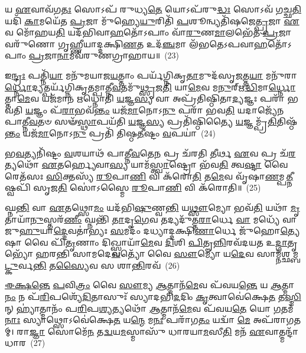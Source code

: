 𑌯 \ul{𑌏}\-𑌵𑌾𑌵᳴𑌗\-\ul{𑌤𑌃} 𑌸𑍋\-𑌽𑌪᳴ 𑌰𑍁𑌧𑍍𑌯\-\ul{𑌤𑍇} 𑌯𑍋\-𑌽𑌪᳴𑌰𑍁\-\ul{𑌦𑍍𑌧𑌃} 𑌸𑍋\-𑌽𑌵᳴ 𑌗𑌚𑍍𑌛\-\ul{𑌤𑌿} 𑌯𑌦𑌿᳴ \ul{𑌕𑌾}\-𑌮𑌯𑍇᳴𑌤 \ul{𑌪𑍍𑌰}\-𑌜𑌾 𑌮𑍁᳴𑌹𑍍𑌯𑍇\-\ul{𑌯𑍁}\-𑌰𑌿𑌤𑌿᳴ \ul{𑌪}\-𑌶𑍂𑌨𑍍𑌵𑍍𑌯𑌤𑌿᳴𑌷𑌜𑍇\-\ul{𑌤𑍍𑌪𑍍𑌰}\-𑌜𑌾 \ul{𑌏}\-𑌵 𑌮𑍋᳴𑌹𑌯\-\ul{𑌤𑌿} 𑌯𑌦᳴𑌭𑌿𑌵𑌾\-\ul{𑌹}\-𑌤𑍋᳴\-𑌽𑌪𑌾𑌂 𑌵𑌾᳴\-\ul{𑌰𑍁}\-𑌣\-\ul{𑌮𑌾}\-𑌲𑌭𑍇᳴𑌤 \ul{𑌪𑍍𑌰}\-𑌜𑌾 𑌵𑌰𑍁᳴𑌣𑍋 𑌗𑍃𑌹𑍍𑌣𑍀𑌯𑌾𑌦𑍍𑌦𑌕𑍍𑌷𑌿\-\ul{𑌣}\-𑌤 𑌉𑌦᳴\-\ul{𑌞𑍍𑌚}\-𑌮𑌾 𑌲᳴𑌭𑌤𑍇\-𑌽𑌪𑌵𑌾\-\ul{𑌹}\-𑌤𑍋᳴\-𑌽\-𑌪𑌾𑌂 \ul{𑌪𑍍𑌰}\-𑌜𑌾\-\ul{𑌨𑌾}\-𑌮𑌵᳴𑌰𑍁𑌣𑌗𑍍𑌰𑌾𑌹𑌾𑌯॥~(23)

{\anuvakamend[{𑌰𑍇\-\ul{𑌤𑍋} 𑌯𑌜᳴𑌮𑌾𑌨𑍇 𑌦𑌧𑌾𑌤𑌿 \ul{𑌲𑍋}\-𑌕 \ul{𑌐}\-𑌨𑍍𑌦𑍍𑌰𑍞 \ul{𑌸}\-𑌪𑍍𑌤𑌤𑍍𑌰𑌿𑍞᳴𑌶𑌚𑍍𑌚}]}%

𑌇\-\ul{𑌨𑍍𑌦𑍍𑌰𑌃} 𑌪𑌤𑍍𑌨𑌿᳴\-\ul{𑌯𑌾} 𑌮𑌨𑍁᳴𑌮𑌯𑌾𑌜\-\ul{𑌯}\-𑌤𑍍𑌤𑌾𑌂 𑌪𑌰𑍍𑌯᳴𑌗𑍍𑌨𑌿𑌕𑍃\-\ul{𑌤𑌾}\-𑌮𑍁𑌦᳴𑌸𑍃\-\ul{𑌜}\-𑌤𑍍𑌤\-\ul{𑌯𑌾} 𑌮𑌨𑍁᳴𑌰𑌾\-\ul{𑌰𑍍𑌧𑍍𑌨𑍋}\-𑌦𑍍𑌯𑌤𑍍𑌪𑌰𑍍𑌯᳴𑌗𑍍𑌨𑌿𑌕𑍃𑌤𑌮𑍍𑌪𑌾𑌤𑍍𑌨𑍀\-\ul{𑌵}\-𑌤𑌮𑍁᳴\-\ul{𑌥𑍍𑌸𑍃}\-𑌜\-\ul{𑌤𑌿} 𑌯𑌾\-\ul{𑌮𑍇}\-𑌵 𑌮\-\ul{𑌨𑍁}\-𑌰𑍍\mbox{}𑌋\-\ul{𑌦𑍍𑌧𑌿}\-\-𑌮𑌾\-\ul{𑌰𑍍𑌧𑍍𑌨𑍋}\-𑌤𑍍𑌤𑌾\-\ul{𑌮𑍇}\-𑌵 𑌯𑌜᳴𑌮𑌾𑌨 𑌋𑌧𑍍𑌨𑍋𑌤𑌿 \ul{𑌯}\-𑌜𑍍𑌞\-\ul{𑌸𑍍𑌯} 𑌵𑌾 𑌅𑌪𑍍𑌰᳴𑌤𑌿𑌷𑍍𑌠𑌿𑌤𑌾\-\ul{𑌦𑍍𑌯}\-𑌜𑍍𑌞𑌃 𑌪𑌰𑌾᳴ 𑌭𑌵𑌤𑌿 \ul{𑌯}\-𑌜𑍍𑌞𑌂 𑌪᳴\-\ul{𑌰𑌾}\-𑌭𑌵᳴\-\ul{𑌨𑍍𑌤𑌂} 𑌯𑌜᳴\-\ul{𑌮𑌾}\-𑌨𑍋\-𑌽\-\ul{𑌨𑍁} 𑌪𑌰𑌾᳴ 𑌭𑌵\-\ul{𑌤𑌿} 𑌯𑌦𑌾𑌜𑍍𑌯𑍇᳴𑌨 𑌪𑌾𑌤𑍍𑌨𑍀\-\ul{𑌵}\-𑌤𑍞 𑌸𑍟᳴\-\ul{𑌸𑍍𑌥𑌾}\-𑌪𑌯᳴𑌤𑌿 \ul{𑌯}\-𑌜𑍍𑌞\-\ul{𑌸𑍍𑌯} 𑌪𑍍𑌰𑌤𑌿᳴𑌷𑍍𑌠𑌿𑌤𑍍𑌯𑍈 \ul{𑌯}\-𑌜𑍍𑌞𑌮𑍍𑌪𑍍𑌰᳴\-\ul{𑌤𑌿}\-𑌤𑌿𑌷𑍍𑌠᳴\-\ul{𑌨𑍍𑌤𑌂} 𑌯𑌜᳴\-\ul{𑌮𑌾}\-𑌨𑍋\-𑌽\-\ul{𑌨𑍁} 𑌪𑍍𑌰𑌤𑌿᳴ 𑌤𑌿𑌷𑍍𑌠\-\ul{𑌤𑍀}\-𑌷𑍍𑌟𑌂 \ul{𑌵}\-𑌪𑌯𑌾॑~(24)

𑌭\-\ul{𑌵}\-𑌤𑍍𑌯𑌨𑌿᳴𑌷𑍍𑌟𑌂 \ul{𑌵}\-𑌶𑌯𑌾𑌥᳴ 𑌪𑌾𑌤𑍍𑌨𑍀\-\ul{𑌵}\-𑌤𑍇\-\ul{𑌨} 𑌪𑍍𑌰 𑌚᳴𑌰𑌤𑌿 \ul{𑌤𑍀}\-𑌰𑍍𑌥 \ul{𑌏}\-𑌵 𑌪𑍍𑌰 𑌚᳴\-\ul{𑌰}\-𑌤𑍍𑌯𑌥𑍋᳴ \ul{𑌏}\-𑌤𑌰𑍍\mbox{}\-\ul{𑌹𑍍𑌯𑍇}\-𑌵𑌾\-\ul{𑌸𑍍𑌯} 𑌯𑌾𑌮᳴\-\ul{𑌸𑍍𑌤𑍍𑌵𑌾}\-𑌷𑍍𑌟𑍍𑌰𑍋 𑌭᳴𑌵\-\ul{𑌤𑌿} 𑌤𑍍𑌵\-\ul{𑌷𑍍𑌟𑌾} 𑌵𑍈 𑌰𑍇𑌤᳴𑌸𑌃 \ul{𑌸𑌿}\-𑌕𑍍𑌤𑌸𑍍𑌯᳴ \ul{𑌰𑍂}\-𑌪𑌾\-\ul{𑌣𑌿} 𑌵𑌿 𑌕᳴𑌰𑍋\-\ul{𑌤𑌿} 𑌤\-\ul{𑌮𑍇}\-𑌵 𑌵𑍃᳴𑌷𑌾\-\ul{𑌣}\-𑌮𑍍𑌪\-\ul{𑌤𑍍𑌨𑍀}\-𑌷𑍍𑌵𑌪𑌿᳴ 𑌸𑍃𑌜\-\ul{𑌤𑌿} 𑌸𑍋॑\-𑌽𑌸𑍍𑌮𑍈 \ul{𑌰𑍂}\-𑌪𑌾\-\ul{𑌣𑌿} 𑌵𑌿 𑌕᳴𑌰𑍋𑌤𑌿॥~(25)

{\anuvakamend[{\-\ul{𑌵}\-𑌪\-\ul{𑌯𑌾} 𑌷𑌟𑍍𑌤𑍍𑌰𑌿𑍞᳴𑌶𑌚𑍍𑌚}]}%

𑌘𑍍𑌨\-\ul{𑌨𑍍𑌤𑌿} 𑌵𑌾 \ul{𑌏}\-𑌤𑌥𑍍𑌸𑍋\-\ul{𑌮𑌂} 𑌯𑌦᳴𑌭𑌿\-\ul{𑌷𑍁}\-𑌣𑍍𑌵\-\ul{𑌨𑍍𑌤𑌿} 𑌯\-\ul{𑌥𑍍𑌸𑍗}\-𑌮𑍍𑌯𑍋 𑌭𑌵᳴\-\ul{𑌤𑌿} 𑌯𑌥𑌾᳴ \ul{𑌮𑍃}\-𑌤𑌾𑌯𑌾᳴\-\ul{𑌨𑍁}\-𑌸𑍍𑌤𑌰᳴\-\ul{𑌣𑍀𑌂} 𑌘𑍍𑌨𑌨𑍍𑌤𑌿᳴ \ul{𑌤𑌾}\-𑌦𑍃\-\ul{𑌗𑍇}\-𑌵 𑌤𑌦𑍍𑌯𑌦𑍁᳴𑌤𑍍𑌤\-\ul{𑌰𑌾}\-𑌰𑍍𑌧𑍇 \ul{𑌵𑌾} 𑌮𑌧𑍍𑌯𑍇᳴ 𑌵𑌾 𑌜𑍁\-\ul{𑌹𑍁}\-𑌯𑌾\-\ul{𑌦𑍍𑌦𑍇}\-𑌵𑌤𑌾॑𑌭𑍍𑌯𑌃 \ul{𑌸}\-𑌮𑌦𑌂᳴ 𑌦𑌧𑍍𑌯𑌾𑌦𑍍𑌦𑌕𑍍𑌷𑌿\-\ul{𑌣𑌾}\-𑌰𑍍𑌧𑍇 𑌜𑍁᳴𑌹𑍋\-\ul{𑌤𑍍𑌯𑍇}\-𑌷𑌾 𑌵𑍈 𑌪𑌿᳴\-\ul{𑌤𑍃}\-𑌣𑌾𑌂 𑌦𑌿𑌖𑍍𑌸𑍍𑌵𑌾𑌯𑌾᳴\-\ul{𑌮𑍇}\-𑌵 \ul{𑌦𑌿}\-𑌶𑌿 \ul{𑌪𑌿}\-𑌤𑍄\-\ul{𑌨𑍍𑌨𑌿}\-𑌰𑌵᳴𑌦𑌯𑌤 𑌉\-\ul{𑌦𑍍𑌗𑌾}\-𑌤𑍃𑌭𑍍𑌯𑍋᳴ 𑌹𑌰𑌨𑍍𑌤𑌿 𑌸𑌾𑌮𑌦𑍇\-\ul{𑌵}\-𑌤𑍍𑌯𑍋᳴ 𑌵𑍈 \ul{𑌸𑍗}\-𑌮𑍍𑌯𑍋 𑌯\-\ul{𑌦𑍇}\-𑌵 𑌸𑌾𑌮𑍍𑌨᳴𑌶𑍍𑌛𑌮𑍍𑌬\-\ul{𑌟𑍍𑌕𑍁}\-𑌰𑍍𑌵\-\ul{𑌨𑍍𑌤𑌿} 𑌤\-\ul{𑌸𑍍𑌯𑍈}\-𑌵 𑌸 𑌶𑌾\-\ul{𑌨𑍍𑌤𑌿}\-𑌰𑌵᳴~(26)

\-\ul{𑌈}\-\-\ul{𑌕𑍍𑌷}\-\-\ul{𑌨𑍍𑌤𑍇} \ul{𑌪}\-𑌵𑌿\-\ul{𑌤𑍍𑌰𑌂} 𑌵𑍈 \ul{𑌸𑍗}\-𑌮𑍍𑌯 \ul{𑌆}\-𑌤𑍍𑌮𑌾𑌨᳴\-\ul{𑌮𑍇}\-𑌵 𑌪᳴𑌵𑌯\-\ul{𑌨𑍍𑌤𑍇} 𑌯 \ul{𑌆}\-𑌤𑍍𑌮𑌾\-\ul{𑌨𑌂} 𑌨 𑌪᳴\-\ul{𑌰𑌿}\-𑌪𑌶𑍍𑌯𑍇᳴\-\ul{𑌦𑌿}\-𑌤𑌾𑌸𑍁𑌃᳴ 𑌸𑍍𑌯𑌾𑌦𑌭𑌿\-\ul{𑌦}\-𑌦𑌿𑌂 \ul{𑌕𑍃}\-𑌤𑍍𑌵𑌾𑌵𑍇॑𑌕𑍍𑌷𑍇\-\ul{𑌤} 𑌤\-\ul{𑌸𑍍𑌮𑌿}\-𑌨𑍍 𑌹𑍍𑌯𑌾॑𑌤𑍍𑌮𑌾𑌨𑌂᳴ 𑌪\-\ul{𑌰𑌿}\-𑌪\-\ul{𑌶𑍍𑌯}\-𑌤𑍍𑌯𑌥𑍋᳴ \ul{𑌆}\-𑌤𑍍𑌮𑌾𑌨᳴\-\ul{𑌮𑍇}\-𑌵 𑌪᳴𑌵𑌯\-\ul{𑌤𑍇} 𑌯𑍋 \ul{𑌗}\-𑌤𑌮᳴\-\ul{𑌨𑌾𑌃} 𑌸𑍍𑌯𑌾𑌥𑍍𑌸𑍋\-𑌽𑌵𑍇॑𑌕𑍍𑌷𑍇\-\ul{𑌤} 𑌯\-\ul{𑌨𑍍𑌮𑍇} 𑌮\-\ul{𑌨𑌃} 𑌪𑌰𑌾᳴𑌗\-\ul{𑌤𑌂} 𑌯𑌦𑍍𑌵𑌾᳴ \ul{𑌮𑍇} 𑌅𑌪᳴𑌰𑌾𑌗𑌤𑌮𑍍। 𑌰𑌾\-\ul{𑌜𑍍𑌞𑌾} 𑌸𑍋𑌮𑍇᳴\-\ul{𑌨} 𑌤\-\ul{𑌦𑍍𑌵}\-𑌯\-\ul{𑌮}\-𑌸𑍍𑌮𑌾𑌸𑍁᳴ 𑌧𑌾𑌰𑌯𑌾\-\ul{𑌮}\-𑌸𑍀\-\ul{𑌤𑌿} 𑌮𑌨᳴ \ul{𑌏}\-𑌵𑌾𑌤𑍍𑌮𑌨𑍍𑌦𑌾᳴𑌧𑌾𑌰~(27)

